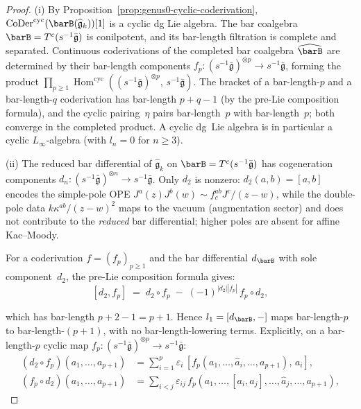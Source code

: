 \begin{proof}
(i)\enspace
By Proposition~\ref{prop:genus0-cyclic-coderivation},
$\operatorname{CoDer}^{\mathrm{cyc}}(\barB(\widehat{\mathfrak{g}}_k))[1]$
is a cyclic dg Lie algebra.
The bar coalgebra $\barB = T^c(s^{-1}\bar{\mathfrak{g}})$ is
conilpotent, and its bar-length filtration is complete and separated.
Continuous coderivations of the completed bar coalgebra
$\widehat{\barB}$ are determined by their bar-length components
$f_p\colon (s^{-1}\bar{\mathfrak{g}})^{\otimes p}
\to s^{-1}\bar{\mathfrak{g}}$, forming the product
$\prod_{p \geq 1}
\operatorname{Hom}^{\mathrm{cyc}}
((s^{-1}\bar{\mathfrak{g}})^{\otimes p},\,
s^{-1}\bar{\mathfrak{g}})$.
The bracket of a bar-length-$p$ and a bar-length-$q$ coderivation
has bar-length $p + q - 1$ (by the pre-Lie composition formula),
and the cyclic pairing~$\eta$ pairs bar-length~$p$ with
bar-length~$p$; both converge in the completed product.
A cyclic dg~Lie algebra is in particular a cyclic
$L_\infty$-algebra (with $l_n = 0$ for $n \geq 3$).

(ii)\enspace
The reduced bar differential of $\widehat{\mathfrak{g}}_k$ on
$\barB = T^c(s^{-1}\bar{\mathfrak{g}})$ has cogeneration components
$d_n\colon (s^{-1}\bar{\mathfrak{g}})^{\otimes n}
\to s^{-1}\bar{\mathfrak{g}}$.
Only $d_2$ is nonzero: $d_2(a,b) = [a,b]$ encodes the simple-pole
OPE $J^a(z)J^b(w) \sim f^{ab}_c J^c/(z{-}w)$, while the double-pole
data $k\kappa^{ab}/(z{-}w)^2$ maps to the vacuum (augmentation
sector) and does not contribute to the \emph{reduced} bar
differential; higher poles are absent for affine Kac--Moody.

For a coderivation $f = (f_p)_{p \geq 1}$ and the bar differential
$d_{\barB}$ with sole component~$d_2$, the pre-Lie composition
formula gives:
\[
[d_2, f_p]
\;=\; d_2 \circ f_p \;-\; (-1)^{|d_2||f_p|}\, f_p \circ d_2,
\]

which has bar-length $p + 2 - 1 = p + 1$.  Hence $l_1 = [d_{\barB},-]$
maps bar-length-$p$ to bar-length-$(p{+}1)$, with no bar-length-lowering
terms.  Explicitly, on a bar-length-$p$ cyclic map
$f_p\colon (s^{-1}\bar{\mathfrak{g}})^{\otimes p}
\to s^{-1}\bar{\mathfrak{g}}$:
\begin{align*}
(d_2 \circ f_p)(a_1, \ldots, a_{p+1})
&= \sum_{i=1}^{p} \varepsilon_i\,
   [f_p(a_1, \ldots, \widehat{a}_i, \ldots, a_{p+1}),\, a_i], \\
(f_p \circ d_2)(a_1, \ldots, a_{p+1})
&= \sum_{i < j} \varepsilon_{ij}\,
   f_p(a_1, \ldots, [a_i, a_j], \ldots, \widehat{a}_j,
   \ldots, a_{p+1}),
\end{align*}


\end{proof}
